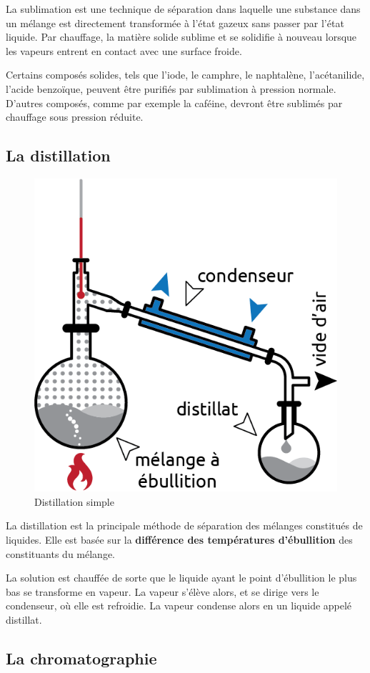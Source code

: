\documentclass[
  11pt,
  a4paper,
  openany]{book}
\begin{document}
La sublimation est une technique de séparation dans laquelle une substance dans un mélange est directement transformée à l'état gazeux sans passer par l'état liquide. Par chauffage, la matière solide sublime et se solidifie à nouveau lorsque les vapeurs entrent en contact avec une surface froide.

Certains composés solides, tels que l'iode, le camphre, le naphtalène, l'acétanilide, l'acide benzoïque, peuvent être purifiés par sublimation à pression normale. D'autres composés, comme par exemple la caféine, devront être sublimés par chauffage sous pression réduite.

\hypertarget{la-distillation}{%
\subsection{La distillation}\label{la-distillation}}

\begin{figure}

{\centering \includegraphics[width=0.4\linewidth]{images/distillation} 

}

\caption{Distillation simple}\label{fig:distillation}
\end{figure}

La distillation est la principale méthode de séparation des mélanges constitués de liquides. Elle est basée sur la \textbf{différence des températures d'ébullition} des constituants du mélange.

La solution est chauffée de sorte que le liquide ayant le point d'ébullition le plus bas se transforme en vapeur. La vapeur s'élève alors, et se dirige vers le condenseur, où elle est refroidie. La vapeur condense alors en un liquide appelé distillat.

\hypertarget{la-chromatographie}{%
\subsection{La chromatographie}\label{la-chromatographie}}
\end{document}
